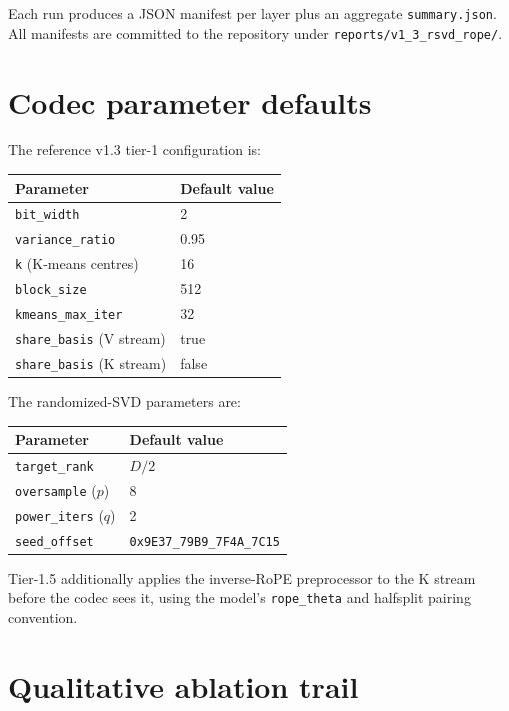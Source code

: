 \documentclass[11pt,a4paper]{article}
\theoremstyle{definition}
\theoremstyle{plain}
\begin{document}
Each run produces a JSON manifest per layer plus an aggregate \verb|summary.json|. All manifests are committed to the repository under \verb|reports/v1_3_rsvd_rope/|.

\section{Codec parameter defaults}
\label{app:params}

The reference v1.3 tier-1 configuration is:
\begin{center}
\begin{tabular}{ll}
  \toprule
  Parameter & Default value \\
  \midrule
  \texttt{bit\_width} & 2 \\
  \texttt{variance\_ratio} & 0.95 \\
  \texttt{k} (K-means centres) & 16 \\
  \texttt{block\_size} & 512 \\
  \texttt{kmeans\_max\_iter} & 32 \\
  \texttt{share\_basis} (V stream) & true \\
  \texttt{share\_basis} (K stream) & false \\
  \bottomrule
\end{tabular}
\end{center}

The randomized-SVD parameters are:
\begin{center}
\begin{tabular}{ll}
  \toprule
  Parameter & Default value \\
  \midrule
  \texttt{target\_rank} & $D/2$ \\
  \texttt{oversample} ($p$) & 8 \\
  \texttt{power\_iters} ($q$) & 2 \\
  \texttt{seed\_offset} & \texttt{0x9E37\_79B9\_7F4A\_7C15} \\
  \bottomrule
\end{tabular}
\end{center}

Tier-1.5 additionally applies the inverse-RoPE preprocessor to the K stream before the codec sees it, using the model's \texttt{rope\_theta} and halfsplit pairing convention.

\section{Qualitative ablation trail}
\label{app:ablation}
\end{document}
